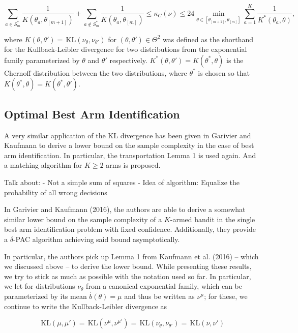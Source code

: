 \documentclass[12pt,]{article}
\newcommand{\KL}{\,\text{KL}}
\begin{document}
\begin{equation*}
\sum_{a \in S^*_m} \frac{1}{K(\theta_a, \theta_{[m+1]})} + \sum_{a \notin S^*_m} \frac{1}{K(\theta_a,\theta_{[m]})} \leq \kappa_C(\nu) \leq 24 \min_{\theta \in [\theta_{[m+1]},\theta_{[m]}]} \sum_{a=1}^{K} \frac{1}{K^*(\theta_a, \theta)},
\end{equation*}

where \(K(\theta, \theta') = \KL(\nu_{\theta}, \nu_{\theta'})\) for
\((\theta, \theta') \in \Theta^2\) was defined as the shorthand for the
Kullback-Leibler divergence for two distributions from the exponential
family parameterized by \(\theta\) and \(\theta'\) respectively.
\(K^*(\theta,\theta') = K(\theta^*, \theta)\) is the Chernoff
distribution between the two distributions, where \(\theta^*\) is chosen
so that \(K(\theta^*,\theta) = K(\theta^*, \theta')\).

\subsection{Optimal Best Arm
Identification}\label{optimal-best-arm-identification}

A very similar application of the KL divergence has been given in
Garivier and Kaufmann to derive a lower bound on the sample complexity
in the case of best arm identification. In particular, the
transportation Lemma 1 is used again. And a matching algorithm for
\(K \geq 2\) arms is proposed.

Talk about: - Not a simple sum of squares - Idea of algorithm: Equalize
the probability of all wrong decisions

In Garivier and Kaufmann (2016), the authors are able to derive a
somewhat similar lower bound on the sample complexity of a \(K\)-armed
bandit in the single best arm identification problem with fixed
confidence. Additionally, they provide a \(\delta\)-PAC algorithm
achieving said bound asymptotically.

In particular, the authors pick up Lemma 1 from Kaufmann et al. (2016)
-- which we discussed above -- to derive the lower bound. While
presenting these results, we try to stick as much as possible with the
notation used so far. In particular, we let for distributions
\(\nu_{\theta}\) from a canonical exponential family, which can be
parameterized by its mean \(\stackrel{.}{b}(\theta) = \mu\) and thus be
written as \(\nu^{\mu}\); for these, we continue to write the
Kullback-Leibler divergence as

\begin{equation*}
\KL(\mu, \mu') = \KL(\nu^{\mu},\nu^{\mu'}) = \KL(\nu_{\theta},\nu_{\theta'}) = \KL(\nu, \nu')
\end{equation*}
\end{document}
